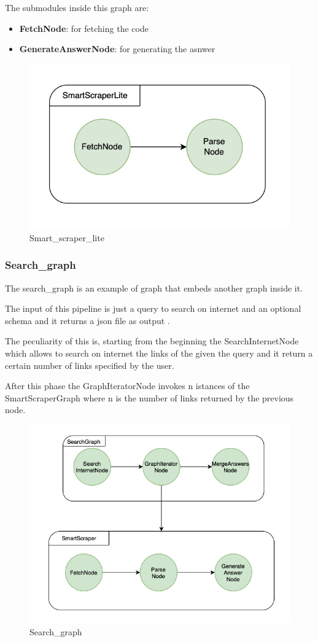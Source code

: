 The submodules inside this graph are:

\begin{itemize}
    \item \textbf{FetchNode}: for fetching the code
    \item \textbf{GenerateAnswerNode}: for generating the asnwer
\end{itemize}

\begin{figure}[h!]
    \centering
    \includegraphics[width=0.5\linewidth]{Assets/smart_scraper_lite.png}
    \caption{Smart\_scraper\_lite}
    \label{fig:enter-label}
\end{figure}
\subsubsection{Search\_graph}
The search\_graph is an example of graph that embeds another graph inside it.

The input of this pipeline is just a query to search on internet and an optional schema and it returns a json file as output .

The peculiarity of this is, starting from the beginning the SearchInternetNode which allows to search on internet the links of the given the query and it return a certain number of links specified by the user.

After this phase the GraphIteratorNode invokes n istances of the SmartScraperGraph where n is the number of links returned by the previous node.
\begin{figure}[h!]
    \centering
    \includegraphics[width=1\linewidth]{Assets/search_graph.png}
    \caption{Search\_graph}
    \label{fig:enter-label}
\end{figure}
